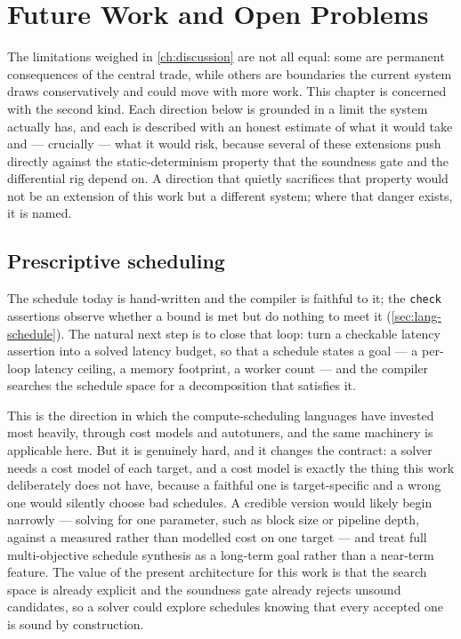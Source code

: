 \chapter{Future Work and Open Problems}\label{ch:future-work}

The limitations weighed in \cref{ch:discussion} are not all equal: some are
permanent consequences of the central trade, while others are boundaries the
current system draws conservatively and could move with more work. This chapter is
concerned with the second kind. Each direction below is grounded in a limit the
system actually has, and each is described with an honest estimate of what it would
take and --- crucially --- what it would risk, because several of these extensions
push directly against the static-determinism property that the soundness gate and
the differential rig depend on. A direction that quietly sacrifices that property
would not be an extension of this work but a different system; where that danger
exists, it is named.

\section{Prescriptive scheduling}\label{sec:fw-prescriptive}

The schedule today is hand-written and the compiler is faithful to it; the
\texttt{check} assertions observe whether a bound is met but do nothing to meet it
(\cref{sec:lang-schedule}). The natural next step is to close that loop: turn a
checkable latency assertion into a solved latency budget, so that a schedule states
a goal --- a per-loop latency ceiling, a memory footprint, a worker count --- and
the compiler searches the schedule space for a decomposition that satisfies it.

This is the direction in which the compute-scheduling languages have invested most
heavily, through cost models and autotuners, and the same machinery is applicable
here. But it is genuinely hard, and it changes the contract: a solver needs a cost
model of each target, and a cost model is exactly the thing this work deliberately
does not have, because a faithful one is target-specific and a wrong one would
silently choose bad schedules. A credible version would likely begin narrowly ---
solving for one parameter, such as block size or pipeline depth, against a measured
rather than modelled cost on one target --- and treat full multi-objective schedule
synthesis as a long-term goal rather than a near-term feature. The value of the
present architecture for this work is that the search space is already explicit and
the soundness gate already rejects unsound candidates, so a solver could explore
schedules knowing that every accepted one is sound by construction.

